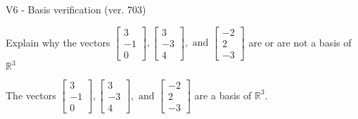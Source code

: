 \begin{exercise}
  \begin{exerciseTitle}V6 - Basis verification (ver. 703)\end{exerciseTitle}
  \begin{exerciseStatement}
    Explain why the vectors \(\left[\begin{array}{r}
3 \\
-1 \\
0
\end{array}\right] , \left[\begin{array}{r}
3 \\
-3 \\
4
\end{array}\right] , \text{ and } \left[\begin{array}{r}
-2 \\
2 \\
-3
\end{array}\right]\) are or are not a basis of \(\mathbb{R}^3\)	


  \end{exerciseStatement}
  \begin{exerciseAnswer}
   The vectors \(\left[\begin{array}{r}
3 \\
-1 \\
0
\end{array}\right] , \left[\begin{array}{r}
3 \\
-3 \\
4
\end{array}\right] , \text{ and } \left[\begin{array}{r}
-2 \\
2 \\
-3
\end{array}\right]\) 
  	 are  a basis of \(\mathbb{R}^3\).
  


  \end{exerciseAnswer}
\end{exercise}